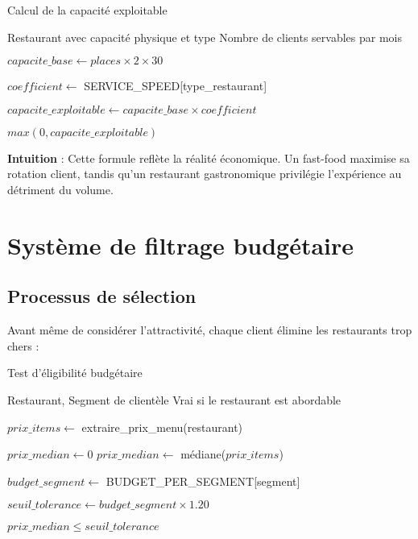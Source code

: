 \documentclass[12pt,a4paper]{article}
\begin{document}
\begin{algorithm}[H]
\caption{Calcul de la capacité exploitable}
\begin{algorithmic}[1]
\REQUIRE Restaurant avec capacité physique et type
\ENSURE Nombre de clients servables par mois

\STATE $capacite\_base \leftarrow places \times 2 \times 30$

\STATE $coefficient \leftarrow$ SERVICE\_SPEED[type\_restaurant]

\STATE $capacite\_exploitable \leftarrow capacite\_base \times coefficient$

\RETURN $max(0, capacite\_exploitable)$
\end{algorithmic}
\end{algorithm}

\textbf{Intuition} : Cette formule reflète la réalité économique. Un fast-food maximise sa rotation client, tandis qu'un restaurant gastronomique privilégie l'expérience au détriment du volume.

\section{Système de filtrage budgétaire}

\subsection{Processus de sélection}

Avant même de considérer l'attractivité, chaque client élimine les restaurants trop chers :

\begin{algorithm}[H]
\caption{Test d'éligibilité budgétaire}
\begin{algorithmic}[1]
\REQUIRE Restaurant, Segment de clientèle
\ENSURE Vrai si le restaurant est abordable

\STATE $prix\_items \leftarrow$ extraire\_prix\_menu(restaurant)

    \STATE $prix\_median \leftarrow 0$
\ELSE
    \STATE $prix\_median \leftarrow$ médiane($prix\_items$)
\ENDIF

\STATE $budget\_segment \leftarrow$ BUDGET\_PER\_SEGMENT[segment]

\STATE $seuil\_tolerance \leftarrow budget\_segment \times 1.20$

\RETURN $prix\_median \leq seuil\_tolerance$
\end{algorithmic}
\end{algorithm}
\end{document}
